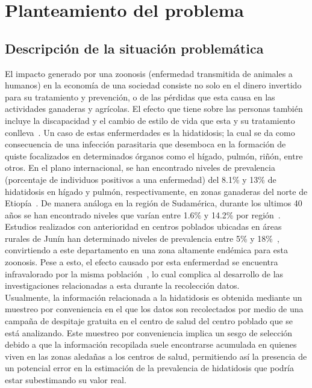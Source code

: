 \section{Planteamiento del problema}
\subsection{Descripción de la situación problemática}
El impacto generado por una zoonosis (enfermedad transmitida de animales a humanos) en la economía de una sociedad consiste no solo en el dinero invertido para su tratamiento y prevención, o de las pérdidas que esta causa en las actividades ganaderas y agrícolas. El efecto que tiene sobre las personas también incluye la discapacidad y el cambio de estilo de vida que esta y su tratamiento conlleva~\cite{shaw2017dalys}. Un caso de estas enfermerdades es la hidatidosis; la cual se da como consecuencia de una infección parasitaria que desemboca en la formación de quiste focalizados en determinados órganos como el hígado, pulmón, riñón, entre otros. En el plano internacional, se han encontrado niveles de prevalencia (porcentaje de individuos positivos a una enfermedad) del 8.1\% y 13\% de hidatidosis en hígado y pulmón, respectivamente, en zonas ganaderas del norte de Etiopía~\cite{kebede2009echinococcosis}. De manera análoga en la región de Sudamérica, durante los ultimos 40 años se han encontrado niveles que varían entre 1.6\% y 14.2\% por región~\cite{larrieu2004echinococcosis}. Estudios realizados con anterioridad en centros poblados ubicadas en áreas rurales de Junín han determinado niveles de prevalencia entre 5\% y 18\%~\cite{santivanez2010factores}, convirtiendo a este departamento en una zona altamente endémica para esta zoonosis. Pese a esto, el efecto causado por esta enfermerdad se encuentra infravalorado por la misma población~\cite{moro2011economic}, lo cual complica al desarrollo de las investigaciones relacionadas a esta durante la recolección datos.\\

Usualmente, la información relacionada a la hidatidosis es obtenida mediante un muestreo por conveniencia en el que los datos son recolectados por medio de una campaña de despitaje gratuita en el centro de salud del centro poblado que se está analizando. Este muestreo por conveniencia implica un sesgo de selección debido a que la información recopilada suele encontrarse acumulada en quienes viven en las zonas aledañas a los centros de salud, permitiendo así la presencia de un potencial error en la estimación de la prevalencia de hidatidosis que podría estar subestimando su valor real.\\

